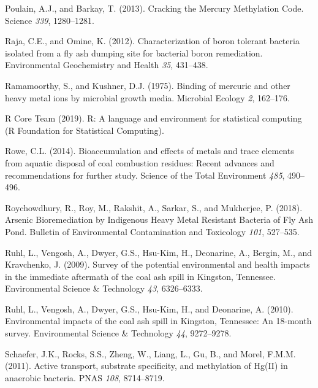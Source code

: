 \documentclass[ms, hidelinks]{uncgdissertationexp}
\theoremstyle{plain}
\theoremstyle{definition}
\theoremstyle{remark}
\begin{document}
\leavevmode\hypertarget{ref-poulainCrackingMercuryMethylation2013}{}%
Poulain, A.J., and Barkay, T. (2013). Cracking the Mercury Methylation Code. Science \emph{339}, 1280--1281.

\leavevmode\hypertarget{ref-rajaCharacterizationBoronTolerant2012}{}%
Raja, C.E., and Omine, K. (2012). Characterization of boron tolerant bacteria isolated from a fly ash dumping site for bacterial boron remediation. Environmental Geochemistry and Health \emph{35}, 431--438.

\leavevmode\hypertarget{ref-ramamoorthyBindingMercuricOther1975}{}%
Ramamoorthy, S., and Kushner, D.J. (1975). Binding of mercuric and other heavy metal ions by microbial growth media. Microbial Ecology \emph{2}, 162--176.

\leavevmode\hypertarget{ref-rcoreteamLanguageEnvironmentStatistical2019}{}%
R Core Team (2019). R: A language and environment for statistical computing (R Foundation for Statistical Computing).

\leavevmode\hypertarget{ref-roweBioaccumulationEffectsMetals2014}{}%
Rowe, C.L. (2014). Bioaccumulation and effects of metals and trace elements from aquatic disposal of coal combustion residues: Recent advances and recommendations for further study. Science of the Total Environment \emph{485}, 490--496.

\leavevmode\hypertarget{ref-roychowdhuryArsenicBioremediationIndigenous2018}{}%
Roychowdhury, R., Roy, M., Rakshit, A., Sarkar, S., and Mukherjee, P. (2018). Arsenic Bioremediation by Indigenous Heavy Metal Resistant Bacteria of Fly Ash Pond. Bulletin of Environmental Contamination and Toxicology \emph{101}, 527--535.

\leavevmode\hypertarget{ref-ruhlSurveyPotentialEnvironmental2009}{}%
Ruhl, L., Vengosh, A., Dwyer, G.S., Hsu-Kim, H., Deonarine, A., Bergin, M., and Kravchenko, J. (2009). Survey of the potential environmental and health impacts in the immediate aftermath of the coal ash spill in Kingston, Tennessee. Environmental Science \& Technology \emph{43}, 6326--6333.

\leavevmode\hypertarget{ref-ruhlEnvironmentalImpactsCoal2010}{}%
Ruhl, L., Vengosh, A., Dwyer, G.S., Hsu-Kim, H., and Deonarine, A. (2010). Environmental impacts of the coal ash spill in Kingston, Tennessee: An 18-month survey. Environmental Science \& Technology \emph{44}, 9272--9278.

\leavevmode\hypertarget{ref-schaeferActiveTransportSubstrate2011}{}%
Schaefer, J.K., Rocks, S.S., Zheng, W., Liang, L., Gu, B., and Morel, F.M.M. (2011). Active transport, substrate specificity, and methylation of Hg(II) in anaerobic bacteria. PNAS \emph{108}, 8714--8719.
\end{document}
